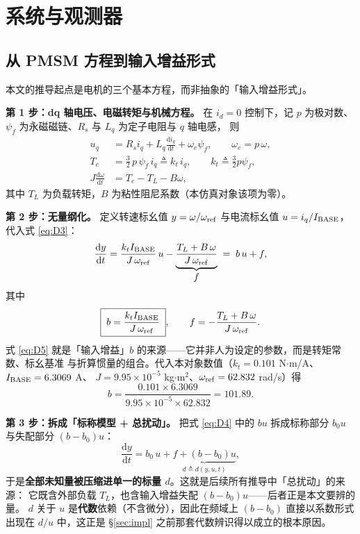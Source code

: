 \documentclass[11pt,a4paper]{ctexart}
\newcommand{\dd}{\mathrm{d}}
\begin{document}
\section{系统与观测器}

\subsection{从 PMSM 方程到输入增益形式}

本文的推导起点是电机的三个基本方程，而非抽象的「输入增益形式」。

\textbf{第 1 步：dq 轴电压、电磁转矩与机械方程。}
在 $i_d=0$ 控制下，记 $p$ 为极对数、$\psi_f$ 为永磁磁链、$R_s$ 与 $L_q$ 为定子电阻与 $q$ 轴电感，
则
\begin{align}
u_q&=R_s i_q+L_q\frac{\dd i_q}{\dd t}+\omega_e\psi_f,\qquad \omega_e=p\,\omega,\label{eq:D1}\\
T_e&=\tfrac32\,p\,\psi_f\,i_q\triangleq k_t\,i_q,\qquad k_t\triangleq\tfrac32 p\psi_f,\label{eq:D2}\\
J\frac{\dd\omega}{\dd t}&=T_e-T_L-B\omega ,
\label{eq:D3}
\end{align}
其中 $T_L$ 为负载转矩，$B$ 为粘性阻尼系数（本仿真对象该项为零）。

\textbf{第 2 步：无量纲化。}
定义转速标幺值 $y=\omega/\omega_{\rm ref}$ 与电流标幺值 $u=i_q/I_{\rm BASE}$，代入式 \eqref{eq:D3}：
\begin{equation}
\frac{\dd y}{\dd t}
=\frac{k_t I_{\rm BASE}}{J\,\omega_{\rm ref}}\,u
-\underbrace{\frac{T_L+B\,\omega}{J\,\omega_{\rm ref}}}_{\textstyle f}
\;=\;b\,u+f ,
\label{eq:D4}
\end{equation}
其中
\begin{equation}
\boxed{\;b=\frac{k_t I_{\rm BASE}}{J\,\omega_{\rm ref}}\;},\qquad
f=-\frac{T_L+B\,\omega}{J\,\omega_{\rm ref}} .
\label{eq:D5}
\end{equation}
式 \eqref{eq:D5} 就是「输入增益」$b$ 的来源——它并非人为设定的参数，而是转矩常数、标幺基准
与折算惯量的组合。代入本对象数值（$k_t=0.101$ N$\cdot$m/A、$I_{\rm BASE}=6.3069$ A、
$J=9.95\times10^{-5}$ kg$\cdot$m$^2$、$\omega_{\rm ref}=62.832$ rad/s）得
\begin{equation}
b=\frac{0.101\times6.3069}{9.95\times10^{-5}\times62.832}=101.89 .
\label{eq:D6}
\end{equation}

\textbf{第 3 步：拆成「标称模型 + 总扰动」。}
把式 \eqref{eq:D4} 中的 $bu$ 拆成标称部分 $b_0u$ 与失配部分 $(b-b_0)u$：
\begin{equation}
\frac{\dd y}{\dd t}=b_0\,u+\underbrace{f+(b-b_0)u}_{\textstyle d\triangleq d(y,u,t)},
\label{eq:D7}
\end{equation}
于是\textbf{全部未知量被压缩进单一的标量 $d$}。这就是后续所有推导中「总扰动」的来源：
它既含外部负载 $T_L$，也含输入增益失配 $(b-b_0)u$——后者正是本文要辨的量。
$d$ 关于 $u$ 是\textbf{代数}依赖（不含微分），因此在频域上 $(b-b_0)$ 直接以系数形式出现在
$d/u$ 中，这正是 §\ref{sec:impl} 之前那套代数辨识得以成立的根本原因。
\end{document}

